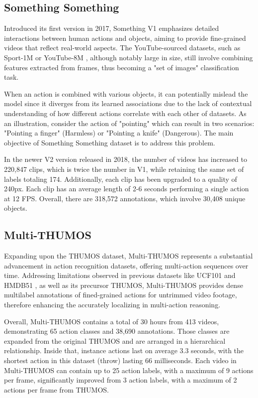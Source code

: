 \documentclass[a4paper]{article}
\begin{document}
\subsection{Something Something}
Introduced its first version in 2017, Something V1 \cite{SomethingV1} emphasizes detailed interactions between human actions and objects, aiming to provide fine-grained videos that reflect real-world aspects. The YouTube-sourced datasets, such as Sport-1M \cite{Sports1M} or YouTube-8M \cite{YouTube8M}, although notably large in size, still involve combining features extracted from frames, thus becoming a "set of images" classification task.

When an action is combined with various objects, it can potentially mislead the model since it diverges from its learned associations due to the lack of contextual understanding of how different actions correlate with each other of datasets. As an illustration, consider the action of "pointing" which can result in two scenarios: "Pointing a finger" (Harmless) or "Pointing a knife" (Dangerous). The main objective of Something Something dataset is to address this problem.

In the newer V2 version released in 2018, the number of videos has increased to 220,847 clips, which is twice the number in V1, while retaining the same set of labels totaling 174. Additionally, each clip has been upgraded to a quality of 240px. Each clip has an average length of 2-6 seconds performing a single action at 12 FPS. Overall, there are 318,572 annotations, which involve 30,408 unique objects.
\subsection{Multi-THUMOS}
Expanding upon the THUMOS \cite{THUMOS} dataset, Multi-THUMOS \cite{Multi-THUMOS} represents a substantial advancement in action recognition datasets, offering multi-action sequences over time. Addressing limitations observed in previous datasets like UCF101 \cite{UCF101} and HMDB51 \cite{HMDB51}, as well as its precursor THUMOS, Multi-THUMOS provides dense multilabel annotations of fined-grained actions for untrimmed video footage, therefore enhancing the accurately localizing in multi-action reasoning.

Overall, Multi-THUMOS contains a total of 30 hours from 413 videos, demonstrating 65 action classes and 38,690 annotations. Those classes are expanded from the original THUMOS and are arranged in a hierarchical relationship. Inside that, instance actions last on average 3.3 seconds, with the shortest action in this dataset (throw) lasting 66 milliseconds. Each video in Multi-THUMOS can contain up to 25 action labels, with a maximum of 9 actions per frame, significantly improved from 3 action labels, with a maximum of 2 actions per frame from THUMOS. 
\end{document}
